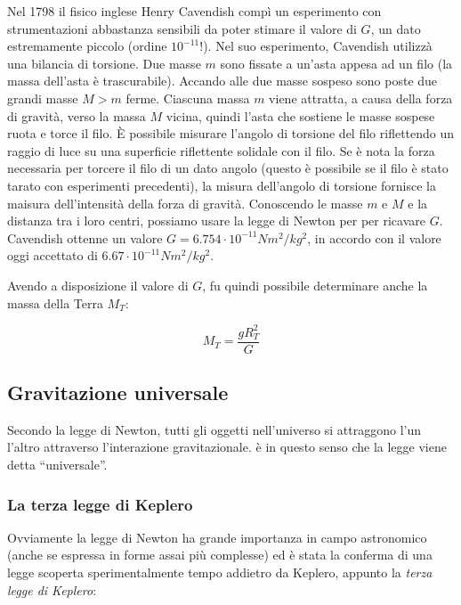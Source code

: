 Nel 1798 il fisico inglese Henry Cavendish compì un esperimento con
strumentazioni abbastanza sensibili da poter stimare il valore di $G$,
un dato estremamente piccolo (ordine $10^{-11}$!). Nel suo esperimento,
Cavendish utilizzà una bilancia di torsione. Due masse $m$ sono fissate
a un'asta appesa ad un filo (la massa dell'asta è trascurabile).
Accando alle due masse sospeso sono poste due grandi masse $M > m$ ferme.
Ciascuna massa $m$ viene attratta, a causa della forza di gravità,
verso la massa $M$ vicina, quindi l'asta che sostiene le masse sospese
ruota e torce il filo. È possibile misurare l'angolo di torsione del
filo riflettendo un raggio di luce su una superficie riflettente
solidale con il filo. Se è nota la forza necessaria per torcere il
filo di un dato angolo (questo è possibile se il filo è stato tarato
con esperimenti precedenti), la misura dell'angolo di torsione fornisce
la maisura dell'intensità della forza di gravità. Conoscendo le masse
$m$ e $M$ e la distanza tra i loro centri, possiamo usare la legge
di Newton per per ricavare $G$.
Cavendish ottenne un valore $G = 6.754 \cdot 10^{-11} Nm^2/kg^2$,
in accordo con il valore oggi accettato di $6.67 \cdot 10^{-11} Nm^2/kg^2$.

Avendo a disposizione il valore di $G$, fu quindi possibile determinare
anche la massa della Terra $M_T$:

\[ M_T = \frac{gR_T^2}{G} \]

\subsection{Gravitazione universale}
Secondo la legge di Newton, tutti gli oggetti nell'universo si attraggono l'un l'altro
attraverso l'interazione gravitazionale. è in questo senso che la legge viene detta
``universale''.


\subsubsection{La terza legge di Keplero}
Ovviamente la legge di Newton ha grande importanza in campo astronomico (anche
se espressa in forme assai più complesse) ed è stata la conferma di una legge scoperta
sperimentalmente tempo addietro da Keplero, appunto la \textit{terza legge di Keplero}:

